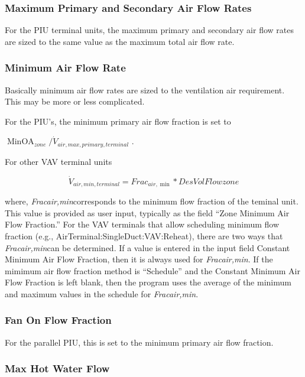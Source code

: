\subsubsection{Maximum Primary and Secondary Air Flow Rates}\label{maximum-primary-and-secondary-air-flow-rates}

For the PIU terminal units, the maximum primary and secondary air flow rates are sized to the same value as the maximum total air flow rate.

\subsubsection{Minimum Air Flow Rate}\label{minimum-air-flow-rate}

Basically minimum air flow rates are sized to the ventilation air requirement. This may be more or less complicated.

For the PIU's, the minimum primary air flow fraction is set to

\(\mathop {MinOA}\nolimits_{zone} /{\dot V_{air,max,primary,terminal}}\) .

For other VAV terminal units

\begin{equation}
{\dot V_{air,min,terminal}} = Fra{c_{air,\min }}*DesVolFlowzone
\end{equation}

where, \emph{Fracair,min}corresponds to the minimum flow fraction of the teminal unit. This value is provided as user input, typically as the field ``Zone Minimum Air Flow Fraction.'' For the VAV terminals that allow scheduling minimum flow fraction (e.g., AirTerminal:SingleDuct:VAV:Reheat), there are two ways that \emph{Fracair,min}can be determined. If a value is entered in the input field Constant Minimum Air Flow Fraction, then it is always used for \emph{Fracair,min}. If the mimimum air flow fraction method is ``Schedule'' and the Constant Minimum Air Flow Fraction is left blank, then the program uses the average of the minimum and maximum values in the schedule for \emph{Fracair,min}.

\subsubsection{Fan On Flow Fraction}\label{fan-on-flow-fraction}

For the parallel PIU, this is set to the minimum primary air flow fraction.

\subsubsection{Max Hot Water Flow}\label{max-hot-water-flow}

